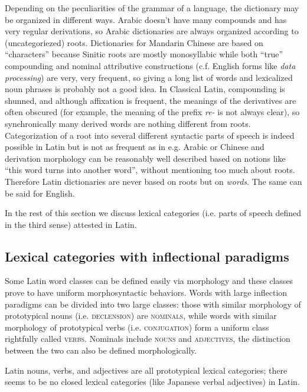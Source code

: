 \documentclass[a4paper, oneside, 12pt]{report}
\newcommand{\form}[1]{\emph{#1}}
\newcommand*{\category}[1]{\textsc{#1}}
\begin{document}
Depending on the peculiarities of the grammar of a language,
the dictionary may be organized in different ways.
Arabic doesn't have many compounds and has very regular derivations,
so Arabic dictionaries are always organized according to (uncategoriezed) roots.
Dictionaries for Mandarin Chinese are based on ``characters''
because Sinitic roots are mostly monosyllabic
while both ``true'' compounding and nominal attributive constructions
(c.f. English forms like \form{data processing}) are very, very frequent, 
so giving a long list of words and lexicalized noun phrases is probably not a good idea.
In Classical Latin, compounding is shunned,
and although affixation is frequent,
the meanings of the derivatives are often obscured
(for example, the meaning of the prefix \form{re-} is not always clear),
so synchronically many derived words are nothing different from roots.
Categorization of a root into several different syntactic parts of speech
is indeed possible in Latin but is not as frequent as in e.g. Arabic or Chinese
and derivation morphology can be reasonably well described based on notions like 
``this word turns into another word'',
without mentioning too much about roots.
Therefore Latin dictionaries are never based on roots but on \emph{words}. 
The same can be said for English.

In the rest of this section we discuss lexical categories (i.e. parts of speech defined in the third sense)
attested in Latin.

\subsection{Lexical categories with inflectional paradigms}\label{sec:grammatical.pos.inflection}

Some Latin word classes can be defined easily via morphology
and these classes prove to have uniform morphosyntactic behaviors.
Words with large inflection paradigms can be divided into two large classes:
those with similar morphology of prototypical nouns (i.e. \category{declension}) are \category{nominals},
while words with similar morphology of prototypical verbs (i.e. \category{conjugation})
form a uniform class rightfully called \category{verbs}.
Nominals include \category{nouns} and \category{adjectives},
the distinction between the two can also be defined morphologically.

Latin nouns, verbs, and adjectives are all prototypical lexical categories;
there seems to be no closed lexical categories (like Japanese verbal adjectives) in Latin.
\end{document}
